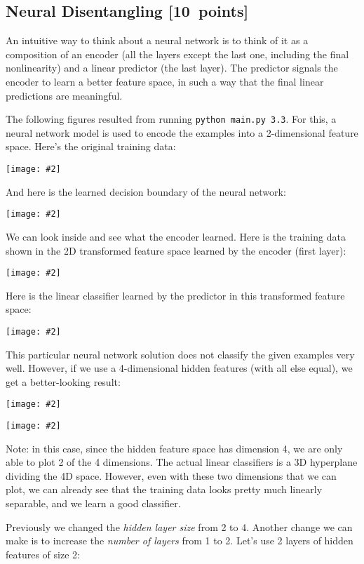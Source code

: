\documentclass{article}
\newcommand\pts[1]{\textcolor{pointscolour}{[#1~points]}}
\newcommand{\centerfig}[2]{\begin{center}\texttt{[image: \#2]}\end{center}}
\begin{document}
\subsection{Neural Disentangling \pts{10}}

An intuitive way to think about a neural network is to think of it as a composition of an encoder (all the layers except the last one, including the final nonlinearity) and a linear predictor (the last layer). The predictor signals the encoder to learn a better feature space, in such a way that the final linear predictions are meaningful.

The following figures resulted from running \texttt{python main.py 3.3}. For this, a neural network model is used to encode the examples into a 2-dimensional feature space. Here's the original training data:

\centerfig{.7}{./figs/sinusoids.png}

And here is the learned decision boundary of the neural network:

\centerfig{.7}{./figs/sinusoids_decision_boundary_[2]_2.png}

We can look inside and see what the encoder learned. Here is the training data shown in the 2D transformed feature space learned by the encoder (first layer):

\centerfig{.7}{./figs/sinusoids_learned_features_[2]_2.png}

Here is the linear classifier learned by the predictor in this transformed feature space:

\centerfig{.7}{./figs/sinusoids_linear_boundary_[2]_2.png}


This particular neural network solution does not classify the given examples very well. However, if we use a 4-dimensional hidden features (with all else equal), we get a better-looking result:

\centerfig{.7}{./figs/sinusoids_decision_boundary_[4]_2.png}
\centerfig{.7}{./figs/sinusoids_linear_boundary_[4]_2.png}

Note: in this case, since the hidden feature space has dimension 4, we are only able to plot 2 of the 4 dimensions. The actual linear classifiers is a 3D hyperplane dividing the 4D space. However, even with these two dimensions that we can plot, we can already see that the training data looks pretty much linearly separable, and we learn a good classifier.

Previously we changed the \emph{hidden layer size} from 2 to 4. Another change we can make is to increase the \emph{number of layers} from 1 to 2. Let's use 2 layers of hidden features of size 2:
\end{document}
